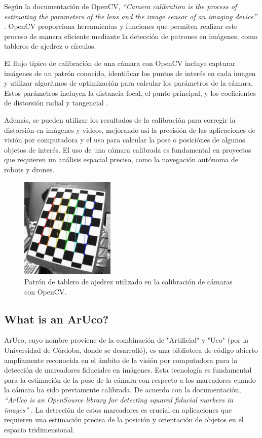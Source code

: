     Según la documentación de OpenCV, \textit{“Camera calibration is the process of estimating the parameters of the lens and the image sensor of an imaging device”} \cite{opencv_calib3d}. OpenCV proporciona herramientas y funciones que permiten realizar este proceso de manera eficiente mediante la detección de patrones en imágenes, como tableros de ajedrez o círculos.

    El flujo típico de calibración de una cámara con OpenCV incluye capturar imágenes de un patrón conocido, identificar los puntos de interés en cada imagen y utilizar algoritmos de optimización para calcular los parámetros de la cámara. Estos parámetros incluyen la distancia focal, el punto principal, y los coeficientes de distorsión radial y tangencial \cite{opencv_tutorial_calib}.

    Además, se pueden utilizar los resultados de la calibración para corregir la distorsión en imágenes y videos, mejorando así la precisión de las aplicaciones de visión por computadora y el uso para calcular la pose o posiciónes de algunos objetos de interés. El uso de una cámara calibrada es fundamental en proyectos que requieren un análisis espacial preciso, como la navegación autónoma de robots y drones.

    \begin{figure}[h!] 
    \centering 
    \includegraphics[width=0.4\textwidth]{pictures/calib_pattern.jpg} %
    \caption{Patrón de tablero de ajedrez utilizado en la calibración de cámaras con OpenCV.} \label{fig} 
    \end{figure}

\subsection{What is an ArUco?}
    ArUco, cuyo nombre proviene de la combinación de "Artificial" y "Uco" (por la Universidad de Córdoba, donde se desarrolló), es una biblioteca de código abierto ampliamente reconocida en el ámbito de la visión por computadora para la detección de marcadores fiduciales en imágenes. Esta tecnología es fundamental para la estimación de la pose de la cámara con respecto a los marcadores cuando la cámara ha sido previamente calibrada. De acuerdo con la documentación, \textit{“ArUco is an OpenSource library for detecting squared fiducial markers in images”} \cite{aruco_docs}. La detección de estos marcadores es crucial en aplicaciones que requieren una estimación precisa de la posición y orientación de objetos en el espacio tridimensional.

